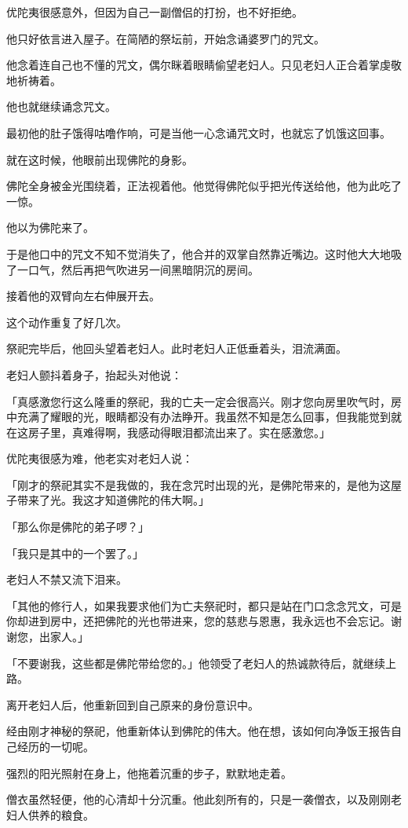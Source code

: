\documentclass[twoside,openany]{book}
\begin{document}
优陀夷很感意外，但因为自己一副僧侣的打扮，也不好拒绝。

他只好依言进入屋子。在简陋的祭坛前，开始念诵婆罗门的咒文。

他念着连自己也不懂的咒文，偶尔眯着眼睛偷望老妇人。只见老妇人正合着掌虔敬地祈祷着。

他也就继续诵念咒文。

最初他的肚子饿得咕噜作响，可是当他一心念诵咒文时，也就忘了饥饿这回事。

就在这时候，他眼前出现佛陀的身影。

佛陀全身被金光围绕着，正法视着他。他觉得佛陀似乎把光传送给他，他为此吃了一惊。

他以为佛陀来了。

于是他口中的咒文不知不觉消失了，他合并的双掌自然靠近嘴边。这时他大大地吸了一口气，然后再把气吹进另一间黑暗阴沉的房间。

接着他的双臂向左右伸展开去。

这个动作重复了好几次。

祭祀完毕后，他回头望着老妇人。此时老妇人正低垂着头，泪流满面。

老妇人颤抖着身子，抬起头对他说：

「真感激您行这么隆重的祭祀，我的亡夫一定会很高兴。刚才您向房里吹气时，房中充满了耀眼的光，眼睛都没有办法睁开。我虽然不知是怎么回事，但我能觉到就在这房子里，真难得啊，我感动得眼泪都流出来了。实在感激您。」

优陀夷很感为难，他老实对老妇人说：

「刚才的祭祀其实不是我做的，我在念咒时出现的光，是佛陀带来的，是他为这屋子带来了光。我这才知道佛陀的伟大啊。」

「那么你是佛陀的弟子啰？」

「我只是其中的一个罢了。」

老妇人不禁又流下泪来。

「其他的修行人，如果我要求他们为亡夫祭祀时，都只是站在门口念念咒文，可是你却进到房中，还把佛陀的光也带进来，您的慈悲与恩惠，我永远也不会忘记。谢谢您，出家人。」

「不要谢我，这些都是佛陀带给您的。」他领受了老妇人的热诚款待后，就继续上路。

离开老妇人后，他重新回到自己原来的身份意识中。

经由刚才神秘的祭祀，他重新体认到佛陀的伟大。他在想，该如何向净饭王报告自己经历的一切呢。

强烈的阳光照射在身上，他拖着沉重的步子，默默地走着。

僧衣虽然轻便，他的心清却十分沉重。他此刻所有的，只是一袭僧衣，以及刚刚老妇人供养的粮食。
\end{document}
